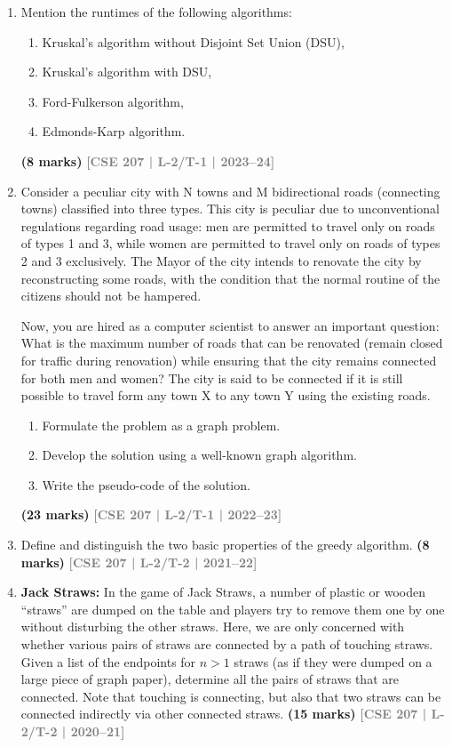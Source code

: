 \documentclass[12pt,a3paper]{article}
\newcommand{\yr}[1]{\hfill\textcolor{gray}{\small\textbf{[#1]}}}
\newcommand{\mk}[1]{\textcolor{orange!70!black}{\small\textbf{(#1 marks)}}}
\begin{document}
\begin{enumerate}
\item Mention the runtimes of the following algorithms:
\begin{enumerate}
\item  Kruskal's algorithm without Disjoint Set Union (DSU), 
\item  Kruskal's algorithm with DSU, 
\item  Ford-Fulkerson algorithm, 
\item  Edmonds-Karp algorithm.
\end{enumerate}
\mk{8} \yr{CSE 207 | L-2/T-1 | 2023--24}

\item Consider a peculiar city with N towns and M bidirectional roads (connecting towns) 
    classified into three types. This city is peculiar due to unconventional regulations 
    regarding road usage: men are permitted to travel only on roads of types 1 and 3, while 
    women are permitted to travel only on roads of types 2 and 3 exclusively. The Mayor 
    of the city intends to renovate the city by reconstructing some roads, with the condition 
    that the normal routine of the citizens should not be hampered.
    
    Now, you are hired as a computer scientist to answer an important question: What is 
    the maximum number of roads that can be renovated (remain closed for traffic during 
    renovation) while ensuring that the city remains connected for both men and women? 
    The city is said to be connected if it is still possible to travel form any town X to any 
    town Y using the existing roads.
\begin{enumerate}
  \item Formulate the problem as a graph problem.
  \item Develop the solution using a well-known graph algorithm.
  \item Write the pseudo-code of the solution.
\end{enumerate}
\mk{23} \yr{CSE 207 | L-2/T-1 | 2022--23}

\item Define and distinguish the two basic properties of the greedy algorithm.
\mk{8} \yr{CSE 207 | L-2/T-2 | 2021--22}

\item \textbf{Jack Straws:} In the game of Jack Straws, a number of plastic or wooden ``straws'' are dumped on the table and players try to remove them one by one without disturbing the other straws. Here, we are only concerned with whether various pairs of straws are connected by a path of touching straws. Given a list of the endpoints for $n > 1$ straws (as if they were dumped on a large piece of graph paper), determine all the pairs of straws that are connected. Note that touching is connecting, but also that two straws can be connected indirectly via other connected straws.
\mk{15} \yr{CSE 207 | L-2/T-2 | 2020--21}



\end{enumerate}
\end{document}
